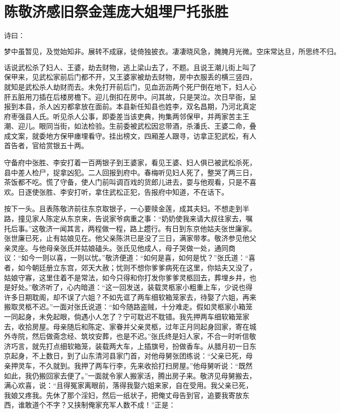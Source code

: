 

\chapter{陈敬济感旧祭金莲\KG 庞大姐埋尸托张胜}


诗曰：

\[
梦中虽暂见，及觉始知非。展转不成寐，徒倚独披衣。
凄凄晓风急，腌腌月光微。空床常达旦，所思终不归。
\]

话说武松杀了妇人、王婆，劫去财物，逃上梁山去了，不题。且说王潮儿街上叫了保甲来，见武松家前后门都不开，又王婆家被劫去财物，房中衣服丢的横三竖四，就知是武松杀人劫财而去。未免打开前后门，见血沥沥两个死尸倒在地下，妇人心肝五脏用刀插在后楼房檐下。迎儿倒扣在房中。问其故，只是哭泣。次日早衙，呈报到本县，杀人凶刃都拿放在面前。本县新任知县也姓李，双名昌期，乃河北真定府枣强县人氏。听见杀人公事，即委差当该吏典，拘集两邻保甲，并两家苦主王潮、迎儿。眼同当街，如法检验。生前委被武松因忿带酒，杀潘氏、王婆二命，叠成文案，就委地方保甲瘗埋看守。挂出榜文，四厢差人跟寻，访拿正犯武松，有人首告者，官给赏银五十两。

守备府中张胜、李安打着一百两银子到王婆家，看见王婆、妇人俱已被武松杀死，县中差人检尸，捉拿凶犯。二人回报到府中。春梅听见妇人死了，整哭了两三日，茶饭都不吃。慌了守备，使人门前叫调百戏的货郎儿进去，耍与他观看，只是不喜欢。日逐使张胜、李安打听，拿住武松正犯，告报府中知道，不在话下。

按下一头。且表陈敬济前往东京取银子，一心要赎金莲，成其夫妇。不想走到半路，撞见家人陈定从东京来，告说家爷病重之事：“奶奶使我来请大叔往家去，嘱托后事。”这敬济一闻其言，两程做一程，路上趱行。有日到东京他姑夫张世廉家。张世廉已死，止有姑娘见在。他父亲陈洪已是没了三日，满家带孝。敬济参见他父亲灵座。与他母亲张氏并姑娘磕头。张氏见他成人，母子哭做一处，通同商议：“如今一则以喜，一则以忧。”敬济便道：“如何是喜，如何是忧？”张氏道：“喜者，如今朝廷册立东宫，郊天大赦；忧则不想你爹爹病死在这里，你姑夫又没了，姑娘守寡，这里住着不是常法，如今只得和你打发你爹爹灵柩回去，葬埋乡井，也是好处。”敬济听了，心内暗道：“这一回发送，装载灵柩家小粗重上车，少说也得许多日期耽阁，却不误了六姐？不如先诓了两车细软箱笼家去，待娶了六姐，再来搬取灵柩不迟。”一面对张氏说道：“如今随路盗贼，十分难走。假如灵柩家小箱笼一同起身，未免起眼，倘遇小人怎了？宁可耽迟不耽错。我先押两车细软箱笼家去，收拾房屋。母亲随后和陈定、家眷并父亲灵柩，过年正月同起身回家，寄在城外寺院，然后做斋念经、筑坟安葬，也是不迟。”张氏终是妇人家，不合一时听信敬济巧言，就先打点细软箱笼，装载两大车，上插旗号，扮做香车。从腊月初一日东京起身，不上数日，到了山东清河县家门首，对他母舅张团练说：“父亲已死，母亲押灵车，不久就到。我押了两车行李，先来收拾打扫房屋。”他母舅听说：“既然如此，我仍搬回家去便了。”一面就令家人搬家活，腾出房子来。敬济见母舅搬去，满心欢喜，说：“且得冤家离眼前，落得我娶六姐来家，自在受用。我父亲已死，我娘又疼我。先休了那个淫妇，然后一纸状子，把俺丈母告到官，追要我寄放东西，谁敢道个不字？又挟制俺家充军人数不成！”正是：

